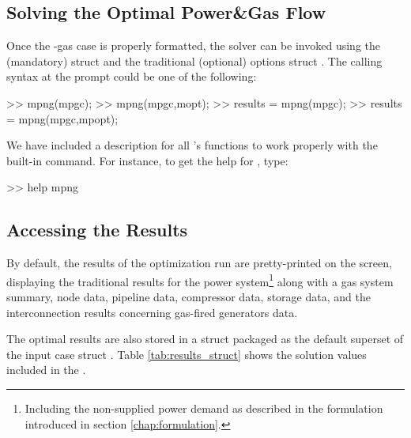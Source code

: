 \subsection{Solving the Optimal Power\&Gas Flow}
\label{subsec:solve_OPGF}

Once the \matpower{}-gas case is properly formatted, the solver can be invoked using the (mandatory)  struct and the traditional (optional) \matpower{} options struct . The calling syntax at the \matlab{} prompt could be one of the following:  

\begin{Code}
>> mpng(mpgc);
>> mpng(mpgc,mopt);
>> results = mpng(mpgc);	
>> results = mpng(mpgc,mpopt);
\end{Code}

We have included a description for all \mpng{}'s functions to work properly with the built-in  command. For instance, to get the help for , type:

\begin{Code}
>> help mpng
\end{Code}

\subsection{Accessing the Results}
\label{subsec:view_results}

By default, the results of the optimization run are pretty-printed on the screen, displaying the traditional \matpower{} results for the power system\footnote{Including the non-supplied power demand as described in the formulation introduced in section \ref{chap:formulation}.} along with a gas system summary, node data, pipeline data, compressor data, storage data, and the interconnection results concerning gas-fired generators data.   

The optimal results are also stored in a  struct packaged as the default \matpower{} superset of the input case struct . Table \ref{tab:results_struct} shows the solution values included in the .

